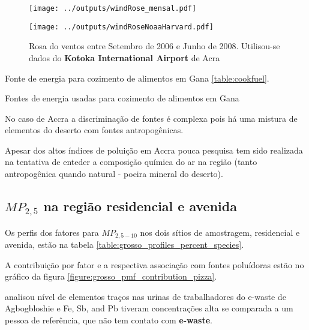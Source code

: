 \begin{figure}[H]
  \centering
  \texttt{[image: ../outputs/windRose\_mensal.pdf]}
  \caption{ \citep{carslaw2012} \label{fig:windRose_mensal}}
\end{figure}


\begin{figure}[H]
  \centering
  \texttt{[image: ../outputs/windRoseNoaaHarvard.pdf]}
  \caption{Rosa do ventos entre
           Setembro de 2006 e Junho de 2008. Utilisou-se dados 
           do \textbf{Kotoka International Airport} de Acra \label{fg:rosaCompleta}}
\end{figure}

Fonte de energia para cozimento de alimentos em Gana \ref{table:cookfuel}.
\begin{table}[H]
 \centering
  
  \caption{Fontes de energia usadas para cozimento de alimentos em 
           Gana \citep{ghanacensus2013} \label{table:cookfuel}}
\end{table}

No caso de Accra a discriminação de fontes é complexa pois
há uma mistura de elementos do deserto com fontes antropogênicas.

Apesar dos altos índices de poluição em Accra pouca pesquisa tem sido 
realizada na tentativa de enteder a composição química do ar na região
(tanto antropogênica quando natural - poeira mineral do deserto). 

\subsection{$MP_{2,5}$ na região residencial e avenida}

Os perfis dos fatores para $MP_{2,5-10}$ nos dois sítios de amostragem, 
residencial e avenida, estão na tabela \ref{table:grosso_profiles_percent_species}.

A contribuição por fator e a respectiva associação com fontes poluídoras
estão no gráfico da figura \ref{figure:grosso_pmf_contribution_pizza}. 

\citep{asante2012} analisou nível de elementos traços nas urinas de trabalhadores 
do e-waste de Agbogbloshie e Fe, Sb, and Pb tiveram concentrações alta se comparada
a um pessoa de referência, que não tem contato com \textbf{e-waste}.



